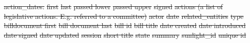 \documentclass[12pt]{article} %
\providecommand{\DIFdeltex}[1]{{\protect\color{red}\sout{#1}}}                      %
\providecommand{\DIFdelbegin}{} %
\providecommand{\DIFdel}[1]{\texorpdfstring{\DIFdeltex{#1}}{}} %
\begin{document}
\DIFdelbegin %
\DIFdel{action\_dates:
        }%
\DIFdel{first
            }%
\DIFdel{last
            }%
\DIFdel{passed lower
            }%
\DIFdel{passed upper
            }%
\DIFdel{signed
        }%
\DIFdel{actions (a list of legislative actions. E.g. referred to a committee)
        }%
\DIFdel{actor
            }%
\DIFdel{date 
            }%
\DIFdel{related\_entities 
            }%
\DIFdel{type
        }%
\DIFdel{billdocument first }%
\DIFdel{bill document last }%
\DIFdel{bill id
    }%
\DIFdel{bill title
    }%
\DIFdel{date created
    }%
\DIFdel{date introduced
    }%
\DIFdel{date signed
    }%
\DIFdel{date updated
    }%
\DIFdel{session
    }%
\DIFdel{short title
    }%
\DIFdel{state
    }%
\DIFdel{summary
    }%
\DIFdel{sunlight\_id
    }%
\DIFdel{unique id
}%
\end{document}
